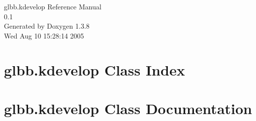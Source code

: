 \documentclass[a4paper]{book}
\begin{document}
\begin{titlepage}
\vspace*{7cm}
\begin{center}
{\Large glbb.kdevelop Reference Manual\\[1ex]\large 0.1 }\\
\vspace*{1cm}
{\large Generated by Doxygen 1.3.8}\\
\vspace*{0.5cm}
{\small Wed Aug 10 15:28:14 2005}\\
\end{center}
\end{titlepage}
\clearemptydoublepage
{}
\tableofcontents
\clearemptydoublepage
{}
\chapter{glbb.kdevelop Class Index}

\chapter{glbb.kdevelop Class Documentation}

\printindex
\end{document}
